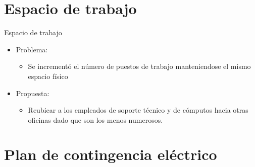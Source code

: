 \documentclass[spanish]{beamer}
\begin{document}
\section{Espacio de trabajo}

\begin{frame}{Espacio de trabajo}
  \begin{itemize}
    \item Problema:
      \begin{itemize}
      \item Se incrementó el número de puestos de trabajo
        manteniendose el mismo espacio físico
      \end{itemize}
    \item Propuesta:
      \begin{itemize}
        \item Reubicar a los empleados de soporte técnico y de cómputos
          hacia otras oficinas dado que son los menos numerosos.
      \end{itemize}
    \end{itemize}
\end{frame}


\section{Plan de contingencia eléctrico}
\end{document}
